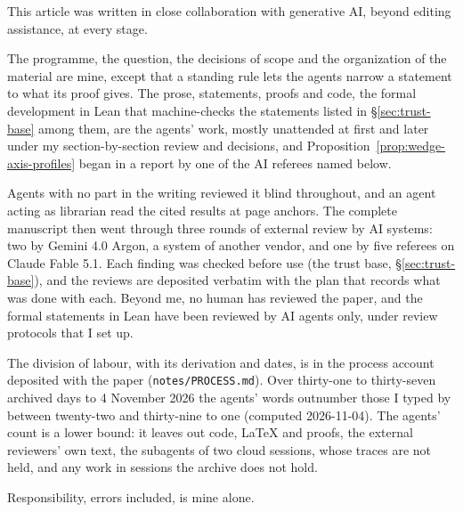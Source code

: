 This article was written in close collaboration with generative AI, beyond editing assistance, at
every stage.

The programme, the question, the decisions of scope and the organization of the material are mine,
except that a standing rule lets the agents narrow a statement to what its proof gives. The prose,
statements, proofs and code, the formal development in Lean that machine-checks the statements listed in
\S\ref{sec:trust-base} among them, are the agents' work, mostly unattended at first and later under my
section-by-section review and decisions, and Proposition~\ref{prop:wedge-axis-profiles} began in a report by
one of the AI referees named below.

Agents with no part in the writing reviewed it blind throughout, and an agent acting as librarian read
the cited results at page anchors. The complete manuscript then went through three rounds of external
review by AI systems: two by Gemini 4.0 Argon, a system of another vendor, and one by five referees on Claude
Fable 5.1. Each finding was checked before use (the trust base, \S\ref{sec:trust-base}), and the reviews are
deposited verbatim with the plan that records what was done with each. Beyond me, no human has reviewed the
paper, and the formal statements in Lean have been reviewed by AI agents only, under review protocols that I
set up.

The division of labour, with its derivation and dates, is in the process account deposited with the paper
(\texttt{notes/PROCESS.md}). Over thirty-one to thirty-seven archived days to 4 November 2026 the agents' words
outnumber those I typed by between twenty-two and thirty-nine to one (computed 2026-11-04). The agents' count is a
lower bound: it leaves out code, LaTeX and proofs, the external reviewers' own text, the subagents of two cloud
sessions, whose traces are not held, and any work in sessions the archive does not hold.

Responsibility, errors included, is mine alone.

